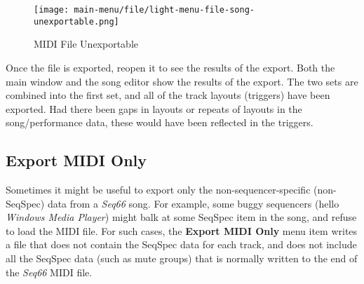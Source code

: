 \begin{figure}[H]
   \centering 
   \texttt{[image: main-menu/file/light-menu-file-song-unexportable.png]}
   \caption{MIDI File Unexportable}
   \label{fig:midi_export_file_unexportable}
\end{figure}

   Once the file is exported, reopen it to see the results of the export.  Both
   the main window and the song editor show the results of the export.  The two
   sets are combined into the first set, and all of the track layouts
   (triggers) have been exported.  Had there been gaps in layouts or repeats of
   layouts in the song/performance data, these would have been reflected in the
   triggers.

\subsection{Export MIDI Only}
\label{subsec:midi_export_file_export_midi_only}

   Sometimes it might be useful to export only the non-sequencer-specific
   (non-SeqSpec) data from a \textsl{Seq66} song.
   For example, some buggy sequencers
   (hello \textsl{Windows Media Player})
   might balk at some SeqSpec item in the song, and refuse to load the MIDI
   file.
   For such cases,
   the \textbf{Export MIDI Only} menu item writes a file that does not contain
   the SeqSpec data for each track, and does not include all the SeqSpec data
   (such as mute groups) that is normally written to the end of the
   \textsl{Seq66} MIDI file.

